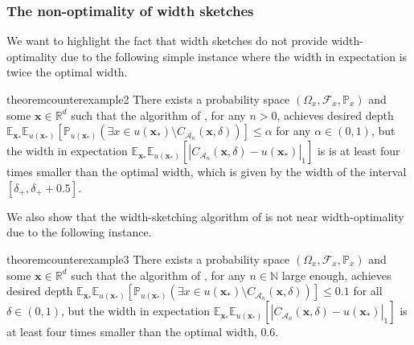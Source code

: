 \documentclass{article} %
\theoremstyle{remark}
\theoremstyle{definition}      %
\begin{document}
\subsubsection{The non-optimality of width sketches} \label{sec:optimize}
We want to highlight the fact that width sketches do not provide width-optimality due to the following simple instance where the width in expectation is twice the optimal width. 
\begin{restatable}{theorem}{counterexample2}\label{prop:counterexample2}
  There exists a probability space $(\Omega_x, \mathcal{F}_x,\mathbb{P}_x)$ and some $\bm{x} \in \mathbb{R}^d$ such that the algorithm of \cite{angelopoulos2024conformal}, for any $n > 0$, achieves desired depth $\mathbb{E}_{\bm{x}_*} \mathbb{E}_{u(\bm{x_*})}[\mathbb{P}_{u(\bm{x_*})}(\exists x \in u(\bm{x_*}) \setminus C_{\mathcal{A}_n}(\bm{x},\delta))]  \leq \alpha$ for any $\alpha \in (0,1)$, but the width in expectation $\mathbb{E}_{\bm{x}_*} \mathbb{E}_{u(\bm{x_*})}[|C_{\mathcal{A}_n}(\bm{x},\delta) - u(\bm{x_*})|_1]$ is is at least four times smaller than the optimal width, which is given by the width of the interval $[\delta_{+},\delta_{+}+0.5]$.

\end{restatable}

We also show that the width-sketching algorithm of \cite{angelopoulos2024conformal} is not near width-optimality due to the following instance.

\begin{restatable}{theorem}{counterexample3}\label{prop:counterexample3}
  There exists a probability space $(\Omega_x, \mathcal{F}_x,\mathbb{P}_x)$ and some $\bm{x} \in \mathbb{R}^d$ such that the algorithm of \cite{angelopoulos2024conformal}, for any $n \in \mathbb{N}$ large enough, achieves desired depth $\mathbb{E}_{\bm{x}_*} \mathbb{E}_{u(\bm{x_*})}[\mathbb{P}_{u(\bm{x_*})}(\exists x \in u(\bm{x_*}) \setminus C_{\mathcal{A}_n}(\bm{x},\delta))]  \leq 0.1$ for all $\delta \in (0,1)$, but the width in expectation $\mathbb{E}_{\bm{x}_*} \mathbb{E}_{u(\bm{x_*})}[|C_{\mathcal{A}_n}(\bm{x},\delta) - u(\bm{x_*})|_1]$ is at least four times smaller than the optimal width, 0.6.

\end{restatable}
\end{document}

